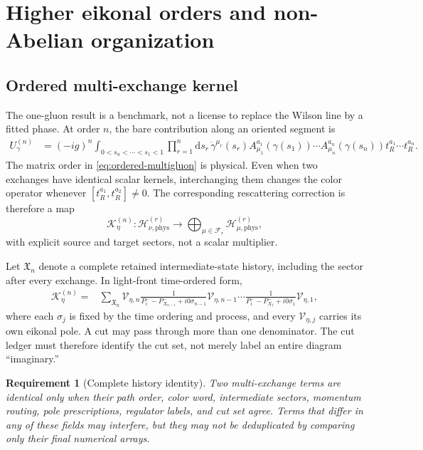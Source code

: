\documentclass[11pt]{article}
\newtheorem{requirement}[definition]{Requirement}
\newcommand{\dd}{\mathrm{d}}
\newcommand{\Hil}{\mathcal H}
\newcommand{\phys}{\mathrm{phys}}
\newcommand{\cV}{\mathcal V}
\newcommand{\cK}{\mathcal K}
\newcommand{\cF}{\mathcal F}
\begin{document}
\section{Higher eikonal orders and non-Abelian organization}
\label{sec:higher-orders}

\subsection{Ordered multi-exchange kernel}

The one-gluon result is a benchmark, not a license to replace the Wilson line
by a fitted phase.  At order \(n\), the bare contribution along an oriented
segment is
\begin{align}
 U_{\gamma}^{(n)}
 & =(-ig)^n
 \int_{0<s_n<\cdots<s_1<1}
 \prod_{r=1}^{n}\dd s_r\,
 \dot\gamma^{\mu_r}(s_r)
 A_{\mu_1}^{a_1}(\gamma(s_1))\cdots
 A_{\mu_n}^{a_n}(\gamma(s_n))
 t_R^{a_1}\cdots t_R^{a_n} .
\label{eq:ordered-multigluon}
\end{align}
The matrix order in \cref{eq:ordered-multigluon} is physical.  Even when two
exchanges have identical scalar kernels, interchanging them changes the color
operator whenever \([t_R^{a_1},t_R^{a_2}]\ne0\).  The corresponding
rescattering correction is therefore a map
\begin{equation}
 \cK_{\eta}^{(n)}:
 \Hil_{\nu,\phys}^{(r)}
 \longrightarrow
 \bigoplus_{\mu\in\cF_r}
 \Hil_{\mu,\phys}^{(r)},
\label{eq:multigluon-kernel-map}
\end{equation}
with explicit source and target sectors, not a scalar multiplier.

Let \(\mathfrak X_n\) denote a complete retained intermediate-state history,
including the sector after every exchange.  In light-front time-ordered form,
\begin{align}
 \cK_{\eta}^{(n)}
 ={}&
 \sum_{\mathfrak X_n}
 \cV_{\eta,n}
 \frac{1}{P^-_i-P^-_{X_{n-1}}+i0\sigma_{n-1}}
 \cV_{\eta,n-1}\cdots
 \frac{1}{P^-_i-P^-_{X_1}+i0\sigma_1}
 \cV_{\eta,1},
\label{eq:lf-multiexchange-resolvent}
\end{align}
where each \(\sigma_j\) is fixed by the time ordering and process, and every
\(\cV_{\eta,j}\) carries its own eikonal pole.  A cut may pass through more
than one denominator.  The cut ledger must therefore identify the cut set,
not merely label an entire diagram ``imaginary.''

\begin{requirement}[Complete history identity]
\label{req:complete-history}
Two multi-exchange terms are identical only when their path order, color word,
intermediate sectors, momentum routing, pole prescriptions, regulator labels,
and cut set agree.  Terms that differ in any of these fields may interfere,
but they may not be deduplicated by comparing only their final numerical
arrays.
\end{requirement}
\end{document}
